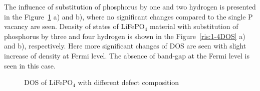 The influence of substitution of phosphorus by one and two hydrogen is presented in the Figure~\ref{ris:1-4DOS1} a) and b), where no significant changes compared to the single P vacancy are seen.
Density of states of LiFePO$_4$ material with substitution of phosphorus by three and four hydrogen is shown in the Figure~\ref{ris:1-4DOS} a) and b), respectively. Here more significant changes of DOS are seen with slight increase of density at Fermi level. The absence of band-gap at the Fermi level is seen in this case. 

\begin{figure}[h!]
\begin{minipage}[h]{0.5\linewidth}
\end{minipage}
\hfill
\begin{minipage}[ht]{0.5\linewidth}
\end{minipage}
\caption{DOS of LiFePO$_4$ with different defect composition }
\label{ris:1-4DOS1}
\end{figure}

